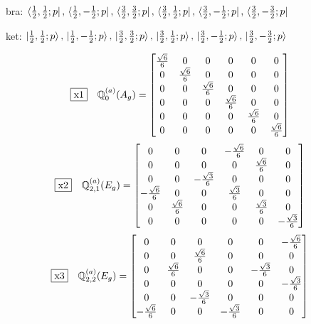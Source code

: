 \documentclass[fleqn,10pt,landscape]{jsarticle}
\begin{document}
\noindent\textbullet\, bra: $\bra{\frac{1}{2},\frac{1}{2};p},\, \bra{\frac{1}{2},- \frac{1}{2};p},\, \bra{\frac{3}{2},\frac{3}{2};p},\, \bra{\frac{3}{2},\frac{1}{2};p},\, \bra{\frac{3}{2},- \frac{1}{2};p},\, \bra{\frac{3}{2},- \frac{3}{2};p}$

\noindent\textbullet\, ket: $\ket{\frac{1}{2},\frac{1}{2};p},\, \ket{\frac{1}{2},- \frac{1}{2};p},\, \ket{\frac{3}{2},\frac{3}{2};p},\, \ket{\frac{3}{2},\frac{1}{2};p},\, \ket{\frac{3}{2},- \frac{1}{2};p},\, \ket{\frac{3}{2},- \frac{3}{2};p}$

\begin{dmath*}
\fbox{x1}\quad \mathbb{Q}_{0}^{(a)}(A_{g})=\begin{bmatrix} \frac{\sqrt{6}}{6} & 0 & 0 & 0 & 0 & 0 \\ 0 & \frac{\sqrt{6}}{6} & 0 & 0 & 0 & 0 \\ 0 & 0 & \frac{\sqrt{6}}{6} & 0 & 0 & 0 \\ 0 & 0 & 0 & \frac{\sqrt{6}}{6} & 0 & 0 \\ 0 & 0 & 0 & 0 & \frac{\sqrt{6}}{6} & 0 \\ 0 & 0 & 0 & 0 & 0 & \frac{\sqrt{6}}{6} \end{bmatrix}
\end{dmath*}
\begin{dmath*}
\fbox{x2}\quad \mathbb{Q}_{2,1}^{(a)}(E_{g})=\begin{bmatrix} 0 & 0 & 0 & - \frac{\sqrt{6}}{6} & 0 & 0 \\ 0 & 0 & 0 & 0 & \frac{\sqrt{6}}{6} & 0 \\ 0 & 0 & - \frac{\sqrt{3}}{6} & 0 & 0 & 0 \\ - \frac{\sqrt{6}}{6} & 0 & 0 & \frac{\sqrt{3}}{6} & 0 & 0 \\ 0 & \frac{\sqrt{6}}{6} & 0 & 0 & \frac{\sqrt{3}}{6} & 0 \\ 0 & 0 & 0 & 0 & 0 & - \frac{\sqrt{3}}{6} \end{bmatrix}
\end{dmath*}
\begin{dmath*}
\fbox{x3}\quad \mathbb{Q}_{2,2}^{(a)}(E_{g})=\begin{bmatrix} 0 & 0 & 0 & 0 & 0 & - \frac{\sqrt{6}}{6} \\ 0 & 0 & \frac{\sqrt{6}}{6} & 0 & 0 & 0 \\ 0 & \frac{\sqrt{6}}{6} & 0 & 0 & - \frac{\sqrt{3}}{6} & 0 \\ 0 & 0 & 0 & 0 & 0 & - \frac{\sqrt{3}}{6} \\ 0 & 0 & - \frac{\sqrt{3}}{6} & 0 & 0 & 0 \\ - \frac{\sqrt{6}}{6} & 0 & 0 & - \frac{\sqrt{3}}{6} & 0 & 0 \end{bmatrix}
\end{dmath*}
\end{document}
